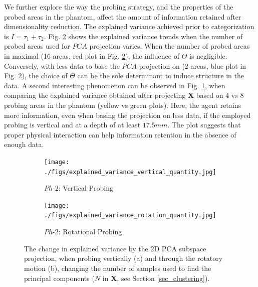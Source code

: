 \documentclass[]{interact}
\theoremstyle{plain}%
\theoremstyle{definition}
\theoremstyle{remark}
\begin{document}
We further explore the way the probing strategy, and the properties of the probed areas in the phantom,
affect the amount of information retained after dimensionality reduction. The explained variance achieved
prior to categorization is $I = \tau_1+\tau_2$. Fig. \ref{inf_retention_quantity:rotation} 
shows the explained variance trends when the number of probed areas used for $PCA$ projection varies. 
When the number of probed areas in maximal (16 areas, red plot in Fig. \ref{inf_retention_quantity:rotation}), 
the influence of $\Theta$ is negligible. Conversely, with less data to base the $PCA$ projection on (2 areas, 
blue plot in Fig. \ref{inf_retention_quantity:rotation}), the choice of $\Theta$ can be the sole determinant to
induce structure in the data. 
A second interesting phenomenon can be observed in Fig. \ref{inf_retention_quantity:vertical},  
when comparing the explained variance obtained after projecting $\mathbf{X}$ based on 4 vs 8 probing areas in
the phantom (yellow vs green plots). Here, the agent retains more information, even when basing the projection 
on less data, if the employed probing is vertical and at a depth of at least $17.5mm$. The plot suggests that 
proper physical interaction can help information retention in the absence of enough data.

\begin{figure}[]
	\centering
	\begin{subfigure}[b]{.48\textwidth}
		\texttt{[image: ./figs/explained\_variance\_vertical\_quantity.jpg]}
		\caption{\tiny{$Ph\text{-}2$: Vertical Probing}}
		\label{inf_retention_quantity:vertical}
	\end{subfigure}
	\begin{subfigure}[b]{.48\textwidth}
		\texttt{[image: ./figs/explained\_variance\_rotation\_quantity.jpg]}
		\caption{\tiny{$Ph\text{-}2$: Rotational Probing}}
		\label{inf_retention_quantity:rotation}
	\end{subfigure}
	\caption{The change in explained variance by the 2D PCA subspace projection, when 
		probing vertically (a) and through the rotatory motion (b), changing the number of samples used 
		to find the principal components ($N$ in $\mathbf{X}$, see Section \ref{sec_clustering}). }
	\label{inf_retention_quantity}
\end{figure}
\end{document}
